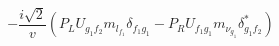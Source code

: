%
\begin{dmath*}
%
  -  \frac{i \sqrt{2}}{v} \left(P_L U_{g_1 f_2} m_{l_{f_1}} \delta_{f_1 g_1} - P_R U_{f_1 g_1} m_{\nu_{g_1}} \delta_{g_1 f_2}^*\right)
%
\end{dmath*}
%
